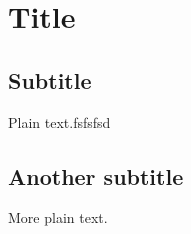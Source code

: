 \documentclass{article}
\begin{document}
\section{Title}

\subsection{Subtitle}

Plain text.fsfsfsd

\subsection{Another subtitle}

More plain text.
\end{document}
